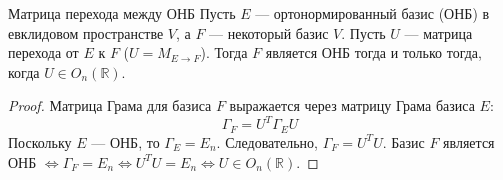\begin{Proposition}{Матрица перехода между ОНБ}{}
	Пусть $E$ — ортонормированный базис (ОНБ) в евклидовом пространстве $V$, а $F$ — некоторый базис $V$.
	Пусть $U$ — матрица перехода от $E$ к $F$ ($U = M_{E \to F}$).
	Тогда $F$ является ОНБ тогда и только тогда, когда $U \in O_n(\mathbb{R})$.
\end{Proposition}

\begin{proof}
	Матрица Грама для базиса $F$ выражается через матрицу Грама базиса $E$:
	\[
	\Gamma_F = U^T \Gamma_E U
	\] 
	Поскольку $E$ — ОНБ, то $\Gamma_E = E_n$.
	Следовательно, $\Gamma_F = U^T U$.
	Базис $F$ является ОНБ $\Leftrightarrow \Gamma_F = E_n \Leftrightarrow U^T U = E_n \Leftrightarrow U \in O_n(\mathbb{R})$.
\end{proof}
